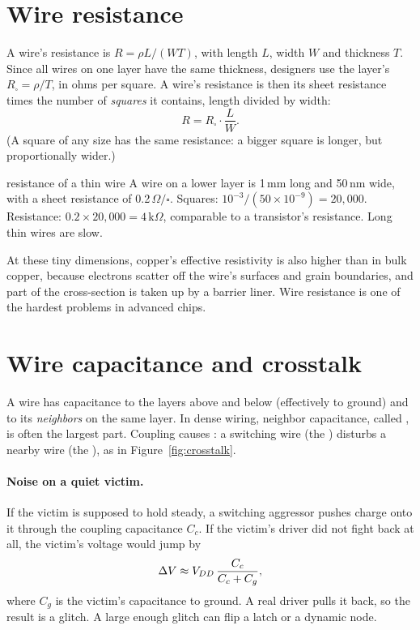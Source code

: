 \section{Wire resistance}

A wire's resistance is $R = \rho L/(W T)$, with length $L$, width $W$ and thickness $T$. Since all wires on one layer have the same thickness, designers use the layer's  $R_\square = \rho/T$, in ohms per square. A wire's resistance is then its sheet resistance times the number of \emph{squares} it contains, length divided by width:
\[
  R = R_\square \cdot \frac{L}{W}.
\]
(A square of any size has the same resistance: a bigger square is longer, but proportionally wider.)

\begin{worked}{resistance of a thin wire}
A wire on a lower layer is 1\,mm long and 50\,nm wide, with a sheet resistance of 0.2\,$\Omega/\square$.
Squares: $10^{-3}/(50\times10^{-9}) = 20{,}000$. Resistance: $0.2 \times 20{,}000 = 4$\,k$\Omega$, comparable to a transistor's resistance. Long thin wires are slow.
\end{worked}

At these tiny dimensions, copper's effective resistivity is also higher than in bulk copper, because electrons scatter off the wire's surfaces and grain boundaries, and part of the cross-section is taken up by a barrier liner. Wire resistance is one of the hardest problems in advanced chips.

\section{Wire capacitance and crosstalk}

A wire has capacitance to the layers above and below (effectively to ground) and to its \emph{neighbors} on the same layer. In dense wiring, neighbor capacitance, called , is often the largest part. Coupling causes : a switching wire (the ) disturbs a nearby wire (the ), as in Figure~\ref{fig:crosstalk}.

\paragraph{Noise on a quiet victim.} If the victim is supposed to hold steady, a switching aggressor pushes charge onto it through the coupling capacitance $C_c$. If the victim's driver did not fight back at all, the victim's voltage would jump by
\[
  \Delta V \approx V_{DD}\,\frac{C_c}{C_c + C_g},
\]
where $C_g$ is the victim's capacitance to ground. A real driver pulls it back, so the result is a glitch. A large enough glitch can flip a latch or a dynamic node.

